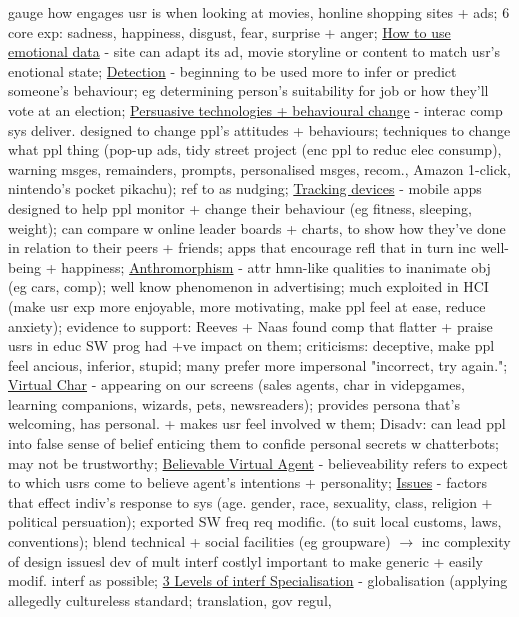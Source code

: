 \documentclass[a4paper]{article}
\begin{document}
\begin{multicols}{3}
        gauge how engages usr is when looking at movies, honline shopping sites + ads; 6 core exp: sadness, happiness, disgust, fear, surprise + anger; \underline{How to use emotional data} - site can
        adapt its ad, movie storyline or content to match usr's enotional state; \underline{Detection} - beginning to be used more to infer or predict someone's behaviour; eg determining person's suitability
        for job or how they'll vote at an election; \underline{Persuasive technologies + behavioural change} - interac comp sys deliver. designed to change ppl's attitudes + behaviours; techniques to change what
        ppl thing (pop-up ads, tidy street project (enc ppl to reduc elec consump), warning msges, remainders, prompts, personalised msges, recom., Amazon 1-click, nintendo's pocket pikachu); ref to as nudging; \underline{Tracking devices} - mobile
        apps designed to help ppl monitor + change their behaviour (eg fitness, sleeping, weight); can compare w online leader boards + charts, to show how they've done in relation to their peers + friends; apps
        that encourage refl that in turn inc well-being + happiness; \underline{Anthromorphism} - attr hmn-like qualities to inanimate obj (eg cars, comp); well know phenomenon in advertising; much
        exploited in HCI (make usr exp more enjoyable, more motivating, make ppl feel at ease, reduce anxiety); evidence to support: Reeves + Naas found comp that flatter + praise usrs in educ SW prog had
        +ve impact on them; criticisms: deceptive, make ppl feel ancious, inferior, stupid; many prefer more impersonal "incorrect, try again."; \underline{Virtual Char} - appearing on our screens (sales agents,
        char in videpgames, learning companions, wizards, pets, newsreaders); provides persona that's welcoming, has personal. + makes usr feel involved w them; Disadv: can lead ppl into false sense of
        belief enticing them to confide personal secrets w chatterbots; may not be trustworthy; \underline{Believable Virtual Agent} - believeability refers to expect to which usrs come to believe agent's
        intentions + personality; \underline{Issues} - factors that effect indiv's response to sys (age. gender, race, sexuality, class, religion + political persuation); exported SW freq req
        modific. (to suit local customs, laws, conventions); blend technical + social facilities (eg groupware) $\to$ inc complexity of design issuesl dev of mult interf costlyl important
        to make generic + easily modif. interf as possible; \underline{3 Levels of interf Specialisation} - globalisation (applying allegedly cultureless standard; translation, gov regul,

\end{multicols}
\end{document}
